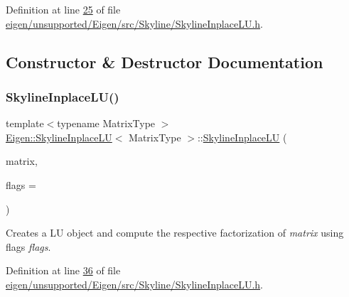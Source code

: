 Definition at line \hyperlink{eigen_2unsupported_2_eigen_2src_2_skyline_2_skyline_inplace_l_u_8h_source_l00025}{25} of file \hyperlink{eigen_2unsupported_2_eigen_2src_2_skyline_2_skyline_inplace_l_u_8h_source}{eigen/unsupported/\+Eigen/src/\+Skyline/\+Skyline\+Inplace\+L\+U.\+h}.



\subsection{Constructor \& Destructor Documentation}
\mbox{\label{class_eigen_1_1_skyline_inplace_l_u_ac76b9384281e73b86b80f770015cf436}} 
\subsubsection{\texorpdfstring{Skyline\+Inplace\+L\+U()}{SkylineInplaceLU()}\hspace{0.1cm}{\footnotesize\ttfamily [1/2]}}
{\footnotesize\ttfamily template$<$typename Matrix\+Type $>$ \\
\hyperlink{class_eigen_1_1_skyline_inplace_l_u}{Eigen\+::\+Skyline\+Inplace\+LU}$<$ Matrix\+Type $>$\+::\hyperlink{class_eigen_1_1_skyline_inplace_l_u}{Skyline\+Inplace\+LU} (\begin{DoxyParamCaption}\item[{Matrix\+Type \&}]{matrix,  }\item[{int}]{flags = {} }\end{DoxyParamCaption})\hspace{0.3cm}{\ttfamily [inline]}}

Creates a LU object and compute the respective factorization of {\itshape matrix} using flags {\itshape flags}. 

Definition at line \hyperlink{eigen_2unsupported_2_eigen_2src_2_skyline_2_skyline_inplace_l_u_8h_source_l00036}{36} of file \hyperlink{eigen_2unsupported_2_eigen_2src_2_skyline_2_skyline_inplace_l_u_8h_source}{eigen/unsupported/\+Eigen/src/\+Skyline/\+Skyline\+Inplace\+L\+U.\+h}.

\mbox{\label{class_eigen_1_1_skyline_inplace_l_u_ac76b9384281e73b86b80f770015cf436}} 
